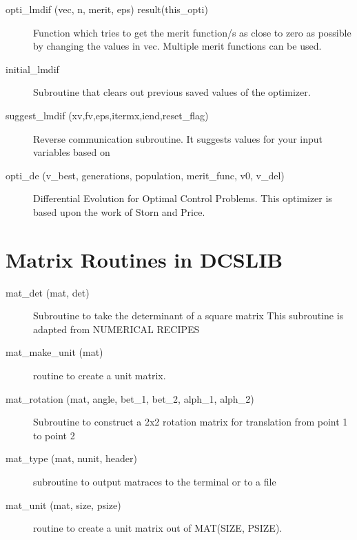 \begin{description}

\item[opti\_lmdif (vec, n, merit, eps) result(this\_opti)] \Newline 
     Function which tries to get the merit function/s as close to zero as possible
     by changing the values in vec. Multiple merit functions can be used.

\item[initial\_lmdif] \Newline 
     Subroutine that clears out previous saved values of the optimizer.

\item[suggest\_lmdif (xv,fv,eps,itermx,iend,reset\_flag)] \Newline 
     Reverse communication subroutine. 
     It suggests values for your input variables based on

\item[opti\_de (v\_best, generations, population, merit\_func, v0, v\_del)] \Newline 
     Differential Evolution for Optimal Control Problems.
     This optimizer is based upon the work of Storn and Price. 

\end{description}

\section{Matrix Routines in DCSLIB}
\label{r:dcs_matrix}      

\begin{description}

\item[mat\_det (mat, det)] \Newline 
     Subroutine to take the determinant of a square matrix
     This subroutine is adapted from NUMERICAL RECIPES

\item[mat\_make\_unit (mat)] \Newline 
     routine to create a unit matrix.

\item[mat\_rotation (mat, angle, bet\_1, bet\_2, alph\_1, alph\_2)] \Newline 
     Subroutine to construct a 2x2 rotation matrix for translation from
     point 1 to point 2

\item[mat\_type (mat, nunit, header)] \Newline 
     subroutine to output matraces to the terminal or to a file

\item[mat\_unit (mat, size, psize)] \Newline 
     routine to create a unit matrix out of MAT(SIZE, PSIZE).

\end{description}

